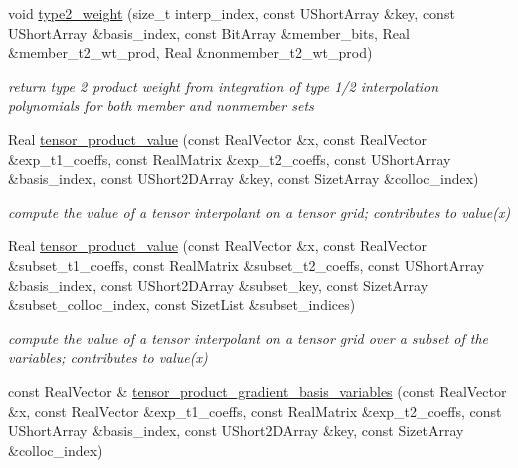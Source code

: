 \begin{DoxyCompactItemize}
void \hyperlink{classPecos_1_1SharedInterpPolyApproxData_a11007d8fbe2b11118e1fa517a948ac48}{type2\+\_\+weight} (size\+\_\+t interp\+\_\+index, const U\+Short\+Array \&key, const U\+Short\+Array \&basis\+\_\+index, const Bit\+Array \&member\+\_\+bits, Real \&member\+\_\+t2\+\_\+wt\+\_\+prod, Real \&nonmember\+\_\+t2\+\_\+wt\+\_\+prod)
\begin{DoxyCompactList}\small\item\em return type 2 product weight from integration of type 1/2 interpolation polynomials for both member and nonmember sets \end{DoxyCompactList}\item 
Real \hyperlink{classPecos_1_1SharedInterpPolyApproxData_a8cec4f56b444b6dc0415a587012860b0}{tensor\+\_\+product\+\_\+value} (const Real\+Vector \&x, const Real\+Vector \&exp\+\_\+t1\+\_\+coeffs, const Real\+Matrix \&exp\+\_\+t2\+\_\+coeffs, const U\+Short\+Array \&basis\+\_\+index, const U\+Short2\+D\+Array \&key, const Sizet\+Array \&colloc\+\_\+index)
\begin{DoxyCompactList}\small\item\em compute the value of a tensor interpolant on a tensor grid; contributes to value(x) \end{DoxyCompactList}\item 
Real \hyperlink{classPecos_1_1SharedInterpPolyApproxData_a8996f48505f3c7ad5ed17a006b4ec11d}{tensor\+\_\+product\+\_\+value} (const Real\+Vector \&x, const Real\+Vector \&subset\+\_\+t1\+\_\+coeffs, const Real\+Matrix \&subset\+\_\+t2\+\_\+coeffs, const U\+Short\+Array \&basis\+\_\+index, const U\+Short2\+D\+Array \&subset\+\_\+key, const Sizet\+Array \&subset\+\_\+colloc\+\_\+index, const Sizet\+List \&subset\+\_\+indices)
\begin{DoxyCompactList}\small\item\em compute the value of a tensor interpolant on a tensor grid over a subset of the variables; contributes to value(x) \end{DoxyCompactList}\item 
const Real\+Vector \& \hyperlink{classPecos_1_1SharedInterpPolyApproxData_a399c6078aedd99c3ae8e95b79742cdf5}{tensor\+\_\+product\+\_\+gradient\+\_\+basis\+\_\+variables} (const Real\+Vector \&x, const Real\+Vector \&exp\+\_\+t1\+\_\+coeffs, const Real\+Matrix \&exp\+\_\+t2\+\_\+coeffs, const U\+Short\+Array \&basis\+\_\+index, const U\+Short2\+D\+Array \&key, const Sizet\+Array \&colloc\+\_\+index)\label{classPecos_1_1SharedInterpPolyApproxData_a399c6078aedd99c3ae8e95b79742cdf5}


\end{DoxyCompactItemize}
